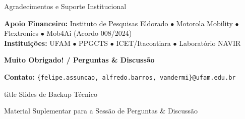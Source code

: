 \documentclass[aspectratio=169,10pt]{beamer}
\begin{document}
\begin{frame}[plain]{Agradecimentos e Suporte Institucional}
\begin{center}
    \vspace{0.35cm}

    {\footnotesize\bfseries Apoio Financeiro:} {\footnotesize Instituto de Pesquisas Eldorado $\bullet$ Motorola Mobility $\bullet$ Flextronics $\bullet$ Mob4Ai (Acordo 008/2024)}\\[3pt]
    {\footnotesize\bfseries Instituições:} {\footnotesize UFAM $\bullet$ PPGCTS $\bullet$ ICET/Itacoatiara $\bullet$ Laboratório NAVIR}

    \vspace{0.45cm}

    {\LARGE\color{CBAPurple}\bfseries Muito Obrigado! / Perguntas \& Discussão}

    \vspace{0.20cm}
    {\small\color{gray}\textbf{Contato:} \texttt{\{felipe.assuncao, alfredo.barros, vandermi\}@ufam.edu.br}}
  \end{center}
\end{frame}

\appendix

\begin{frame}[plain]
  \vfill
  \centering
  \begin{beamercolorbox}[sep=8pt,center,shadow=true,rounded=true]{title}
    \Huge Slides de Backup Técnico\par
    \vspace{0.2cm}
    \normalsize Material Suplementar para a Sessão de Perguntas \& Discussão
  \end{beamercolorbox}
  \vfill
\end{frame}
\end{document}
